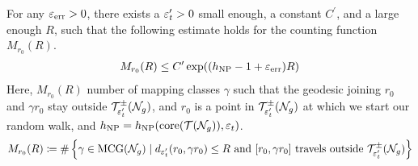 \begin{proposition}
  \label{prop:counting-geodesics}
  For any $\varepsilon_{\mathrm{err}} > 0$, there exists a $\varepsilon_t^{\prime} > 0$ small enough, a constant $C^{\prime}$, and a large enough $R$, such that the following estimate holds for the counting function $M_{r_0}(R)$.
  \begin{align*}
    M_{r_0}(R) \leq C^{\prime} \exp((h_{\mathrm{NP}} - 1 + \varepsilon_{\mathrm{err}})R)
  \end{align*}
  Here, $M_{r_0}(R)$  number of mapping classes $\gamma$ such that the geodesic joining $r_0$ and $\gamma r_0$ stay outside $\mathcal{T}_{\varepsilon_t^{\prime}}^{\pm}(\mathcal{N}_g)$, and $r_0$ is a point in $\mathcal{T}_{\varepsilon_t^{\prime}}^{\pm}(\mathcal{N}_g)$ at which we start our random walk, and $h_{\mathrm{NP}} = h_{\mathrm{NP}}(\mathrm{core}(\mathcal{T}(\mathcal{N}_g)), \varepsilon_t)$.
  \begin{align*}
    M_{r_0}(R) \coloneqq \#\left\{ \gamma \in \mathrm{MCG}(\mathcal{N}_g) \mid \text{$d_{\varepsilon_t^{\prime}}(r_0, \gamma r_0) \leq R$  and $[r_0, \gamma r_0]$ travels outside $\mathcal{T}_{\varepsilon_t^{\prime}}^{\pm}(\mathcal{N}_g)$}   \right\}
  \end{align*}
\end{proposition}

